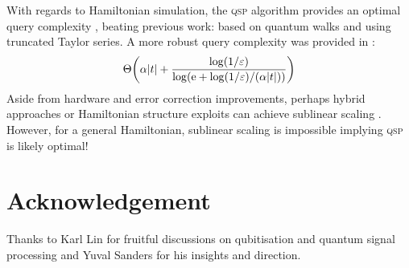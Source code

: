 \documentclass{article}
\begin{document}
With regards to Hamiltonian simulation, the \textsc{qsp} algorithm provides an optimal query complexity \cite{LC17}, beating previous work: \cite{BCK15} based on quantum walks and \cite{BCCKS15} using truncated Taylor series. A more robust query complexity was provided in \cite{GSLW19}:
\begin{equation}
    \Theta\bigg(\alpha \abs{t} + \frac{\log(1/\varepsilon)}{\log(\mathrm{e} + \log(1/\varepsilon)/(\alpha\abs{t}))} \bigg)
\end{equation}
Aside from hardware and error correction improvements, perhaps hybrid approaches or Hamiltonian structure exploits can achieve sublinear scaling \cite{CHICCS20}. However, for a general Hamiltonian, sublinear scaling is impossible \cite{BACS06} implying \textsc{qsp} is likely optimal!

\section*{Acknowledgement}\label{sec:ack}
Thanks to Karl Lin for fruitful discussions on qubitisation and quantum signal processing and Yuval Sanders for his insights and direction.

\newpage


\end{document}
